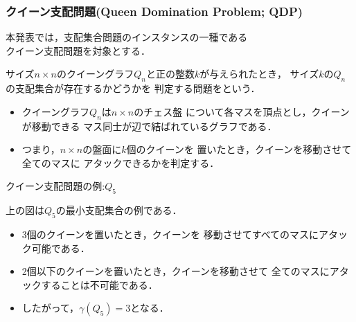 \documentclass[dvipdfmx,10pt]{beamer}
\begin{document}
\begin{frame}\frametitle{クイーン支配問題(Queen Domination Problem; QDP)}
 \begin{alertblock}{} \centering
    本発表では，支配集合問題のインスタンスの一種である\\
    \alert{クイーン支配問題}を対象とする．
  \end{alertblock}
 \begin{block}{}
  サイズ$n\times n$のクイーングラフ$Q_n$と正の整数$k$が与えられたとき，
  サイズ$k$の$Q_n$の支配集合が存在するかどうかを
  判定する問題をという．
  \begin{itemize}
   \item クイーングラフ$Q_n$は$n\times n$のチェス盤
	 について各マスを頂点とし，クイーンが移動できる
	 マス同士が辺で結ばれているグラフである．
   \item つまり，$n \times n$の盤面に$k$個のクイーンを
	 置いたとき，クイーンを移動させて全てのマスに
	 アタックできるかを判定する．
  \end{itemize}
 \end{block}
\end{frame}
 
 
%
%

\begin{frame}{クイーン支配問題の例:$Q_5$}
  \begin{exampleblock}{}
  \begin{center}
   \scalebox{1.3}{
   
   }
  \end{center}
 \end{exampleblock}
 上の図は$Q_5$の最小支配集合の例である．
 \begin{itemize}
  \item 3個のクイーンを置いたとき，クイーンを
	移動させてすべてのマスにアタック可能である．
  \item 2個以下のクイーンを置いたとき，クイーンを移動させて
	全てのマスにアタックすることは不可能である．
  \item したがって，$\gamma(Q_{5})=3$となる．
 \end{itemize}
\end{frame}


%
%
\end{document}
